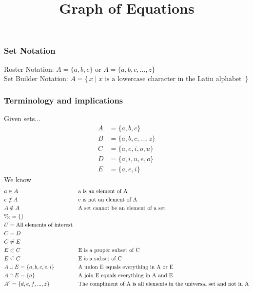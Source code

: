 \documentclass[]{article}
\title{\vspace{-5ex}Graph of Equations \vspace{-5ex}}
\author{}
\date{}
\begin{document}
	\maketitle{}
	
	\subsection*{}
	
	\subsubsection*{Set Notation}
	Roster Notation: $ A = \{ a, b, c \} $ or $ A = \{ a, b, c, ..., z \} $ \\
	Set Builder Notation: $ A = \{\,x \mid x \text{ is a lowercase character in the Latin alphabet }\,\}$
	
	\subsubsection*{Terminology and implications}
	Given sets...
	\begin{align*}
		A &= \{ a, b, c \} \\
		B &= \{ a, b, c, ..., z \} \\
		C &= \{ a, e, i, o, u \} \\
		D &= \{ a, i, u, e, o \} \\
		E &= \{ a, e, i \}
	\end{align*}
	We know
	\begin{align*}
		& a \in A              & &\text{a is an element of A} \\
		& e \notin A        & &\text{e is not an element of A} \\
		& A \notin A        & &\text{A set cannot be an element of a set} \\
		& \O = \{ \}           & & \\
		& U = \text{All elements of interest} & & \\
		& C = D               && \\
		& C \neq E          & & \\
		& E \subset C     & &\text{E is a proper subset of C} \\
		& E \subseteq C & &\text{E is a subset of C} \\
		& A \cup E = \{ a, b, c, e, i \} & &\text{A union E equals everything in A or E} \\
		& A \cap E = \{ a \} & &\text{A join E equals everything in A and E} \\
		& A^c = \{ d, e, f, ..., z \} & &\text{The compliment of A is all elements in the universal set and not in A}
	\end{align*}
	
\end{document}
